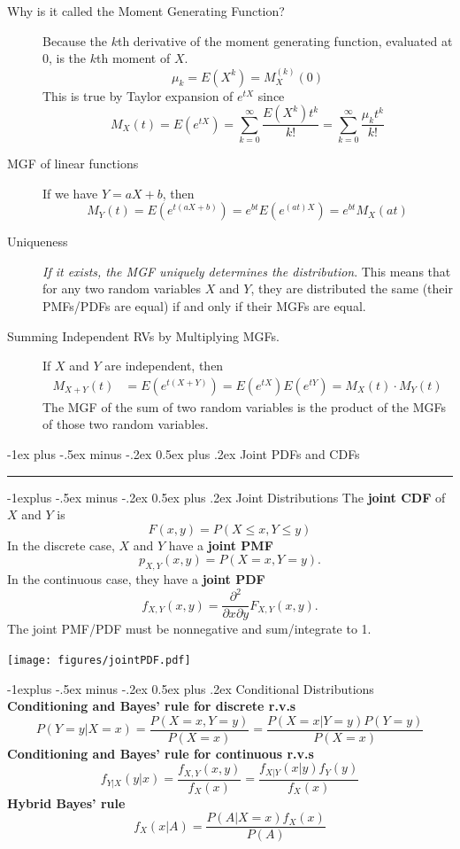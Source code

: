 \documentclass[10pt,landscape]{article}
\makeatletter
\renewcommand{\section}{\@startsection{section}{1}{0mm}%
                                {-1ex plus -.5ex minus -.2ex}%
                                {0.5ex plus .2ex}%
                                {\normalfont\large\bfseries}}
\renewcommand{\subsection}{\@startsection{subsection}{2}{0mm}%
                                {-1explus -.5ex minus -.2ex}%
                                {0.5ex plus .2ex}%
                                {\normalfont\normalsize\bfseries}}
\makeatother
\begin{document}
\begin{multicols*}{3}
\begin{description}
		\item[Why is it called the Moment Generating Function?] Because the $k$th derivative of the moment generating function, evaluated at $0$, is the $k$th moment of $X$.
		\[\mu_k = E(X^k) = M_X^{(k)}(0)\]
		This is true by Taylor expansion of $e^{tX}$ since
		\[M_X(t) = E(e^{tX}) = \sum_{k=0}^\infty \frac{E(X^k)t^k}{k!} = \sum_{k=0}^\infty \frac{\mu_k t^k}{k!} \]
						
		\item[MGF of linear functions] If we have $Y = aX + b$, then
		\[M_Y(t) = E(e^{t(aX + b)}) =  e^{bt}E(e^{(at)X}) = e^{bt}M_X(at)\]
						       
		\item[Uniqueness] \emph{If it exists, the MGF uniquely determines the distribution}. This means that for any two random variables $X$ and $Y$, they are distributed the same (their PMFs/PDFs are equal) if and only if their MGFs are equal. 
		
		\item[Summing Independent RVs by Multiplying MGFs.] If $X$ and $Y$ are independent, then
		\begin{align*}
			M_{X+Y}(t) & = E(e^{t(X + Y)}) = E(e^{tX})E(e^{tY}) = M_X(t) \cdot M_Y(t) 
		\end{align*}
		The MGF of the sum of two random variables is the product of the MGFs of those two random variables.
	\end{description}
			
	\section{Joint PDFs and CDFs}\smallskip \hrule height 2pt \smallskip
	\subsection{Joint Distributions}
	The \textbf{joint CDF} of $X$ and $Y$ is 
	$$F(x,y)=P(X \leq x, Y \leq y)$$
	In the discrete case, $X$ and $Y$ have a \textbf{joint PMF} 
	$$p_{X,Y}(x,y) = P(X=x,Y=y).$$ In the continuous case, they have a \textbf{joint PDF}
	\[f_{X,Y}(x,y) = \frac{\partial^2}{\partial x \partial y} F_{X,Y}(x,y).\]
	The joint PMF/PDF must be nonnegative and sum/integrate to 1.
	\begin{minipage}{\linewidth}
		\centering
		\texttt{[image: figures/jointPDF.pdf]}
	\end{minipage}
	
	\subsection{Conditional Distributions}
	\textbf{Conditioning and Bayes' rule for discrete r.v.s}
	\[P(Y=y|X=x) = \frac{P(X=x, Y=y)}{P(X=x)} = \frac{P(X=x|Y=y)P(Y=y)}{P(X=x)}\]
	\textbf{Conditioning and Bayes' rule for continuous r.v.s}
	\[f_{Y|X}(y|x) = \frac{f_{X,Y}(x, y)}{f_X(x)} = \frac{f_{X|Y}(x|y)f_Y(y)}{f_X(x)}\]
	\textbf{Hybrid Bayes' rule}
	\[f_X(x|A) = \frac{P(A | X = x)f_X(x)}{P(A)}\]
			

\end{multicols*}
\end{document}
